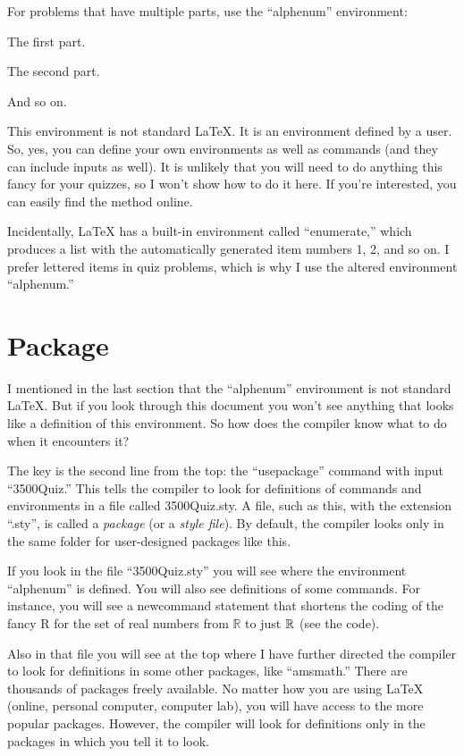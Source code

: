 \documentclass{article}
\begin{document}
For problems that have multiple parts, use the ``alphenum'' environment:
\begin{alphenum}
  \item The first part.
  \item The second part.
  \item And so on.
\end{alphenum}
This environment is not standard \LaTeX.  It is an environment defined by a user.  So, yes, you can define your own environments as
well as commands (and they can include inputs as well).  It is unlikely that you will need to do anything this fancy for your quizzes,
so I won't show how to do it here.  If you're interested, you can easily find the method online.

Incidentally, {\LaTeX} has a built-in environment called ``enumerate,'' which produces a list with the automatically generated item
numbers 1, 2, and so on. I prefer lettered items in quiz problems, which is why I use the altered environment ``alphenum.''

\section{Package}

I mentioned in the last section that the ``alphenum'' environment is not standard \LaTeX.  But if you look through this document you
won't see anything that looks like a definition of this environment.  So how does the compiler know what to do when it encounters
it?

The key is the second line from the top:  the ``usepackage'' command with input ``3500Quiz.''  This tells the compiler to
look for definitions of commands and environments in a file called 3500Quiz.sty.  A file, such as this, with the extension
``.sty'', is called a \emph{package} (or a \emph{style file}).  By default, the compiler looks only in the same folder for
user-designed packages like this.

If you look in the file ``3500Quiz.sty'' you will see where the environment ``alphenum'' is defined.  You will also see definitions
of some commands.  For instance, you will see a newcommand statement that shortens the coding of the fancy R for the set of real
numbers from \(\mathbb{R}\) to just \({\mathbb{R}}\) (see the code).

Also in that file you will see at the top where I have further directed the compiler to look for definitions in some other
packages, like ``amsmath.'' There are thousands of packages freely available.  No matter how you are using {\LaTeX} (online,
personal computer, computer lab), you will have access to the more popular packages.  However, the compiler will look for
definitions only in the packages in which you tell it to look.
\end{document}
